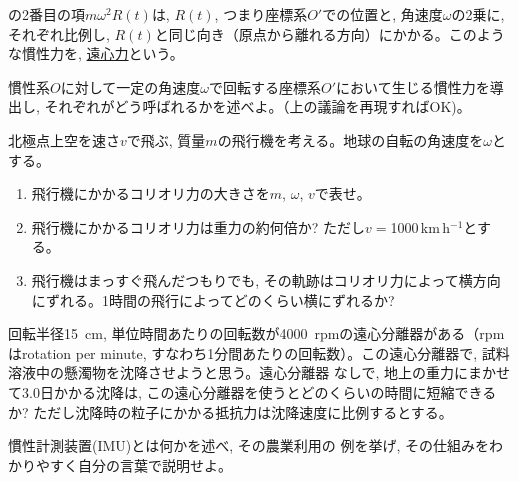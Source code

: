 の2番目の項$m\omega^2 R(t)$は, $R(t)$, つまり座標系$O'$での位置と, 角速度$\omega$の2乗に, 
それぞれ比例し, $R(t)$と同じ向き（原点から離れる方向）にかかる。このような慣性力を, 
\underline{遠心力}という。
\vspace{0.2cm}

\begin{q}\label{q:inert_frame_rot_0}
慣性系$O$に対して一定の角速度$\omega$で回転する座標系$O'$において生じる慣性力を導出し, 
それぞれがどう呼ばれるかを述べよ。（上の議論を再現すればOK)。
\end{q}
\mv

\begin{q}\label{q:inert_frame_rot}
北極点上空を速さ$v$で飛ぶ, 質量$m$の飛行機を考える。地球の自転の角速度を$\omega$とする。
\begin{enumerate}
\item 飛行機にかかるコリオリ力の大きさを$m$, $\omega$, $v$で表せ。
\item 飛行機にかかるコリオリ力は重力の約何倍か? ただし$v=$1000\,km$\,$h$^{-1}$とする。
\item 飛行機はまっすぐ飛んだつもりでも, その軌跡はコリオリ力によって横方向にずれる。1時間の飛行によってどのくらい横にずれるか?
\end{enumerate}
\end{q}
\mv

\begin{q}\label{q:centrifuge}
回転半径15~cm, 単位時間あたりの回転数が4000~rpmの遠心分離器がある（rpmはrotation per minute, 
すなわち1分間あたりの回転数）。この遠心分離器で, 試料溶液中の懸濁物を沈降させようと思う。遠心分離器
なしで, 地上の重力にまかせて3.0日かかる沈降は, この遠心分離器を使うとどのくらいの時間に短縮できるか?
ただし沈降時の粒子にかかる抵抗力は沈降速度に比例するとする。
\end{q}
\mv

\begin{q}\label{q:IMU} 慣性計測装置(IMU)とは何かを述べ, その農業利用の
例を挙げ, その仕組みをわかりやすく自分の言葉で説明せよ。\end{q}\mv


